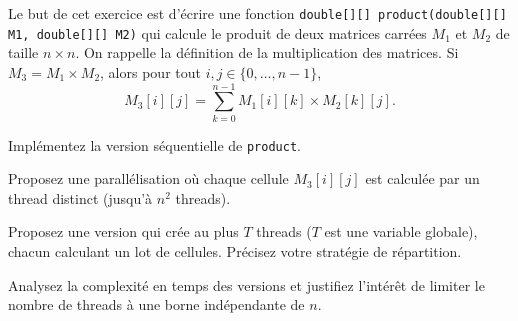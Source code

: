 
\begingroup

\begin{exercice}[Parallélisation]
  \label{exo:introduction/matrix}

  Le but de cet exercice est d'écrire une fonction \lstinline{double[][] product(double[][] M1, double[][] M2)}
  qui calcule le produit de deux matrices carrées $M_1$ et $M_2$ de taille $n\times n$.
  On rappelle la définition de la multiplication des matrices. Si $M_3 = M_1 \times M_2$, alors pour tout
  $i,j \in \{0,\dots,n-1\}$,
  $$
    M_3[i][j] = \sum_{k=0}^{n-1} M_1[i][k] \times M_2[k][j].
  $$

  \begin{question}
    \item Implémentez la version séquentielle de \lstinline{product}.
    \item Proposez une parallélisation où chaque cellule $M_3[i][j]$ est calculée par un thread distinct (jusqu'à $n^2$ threads). 
    \item Proposez une version qui crée au plus $T$ threads ($T$ est une variable globale), chacun calculant un lot de cellules.
      Précisez votre stratégie de répartition.
    \item Analysez la complexité en temps des versions et justifiez l'intérêt
          de limiter le nombre de threads à une borne indépendante de $n$.
  \end{question}

\end{exercice}

\endgroup
\endinput

